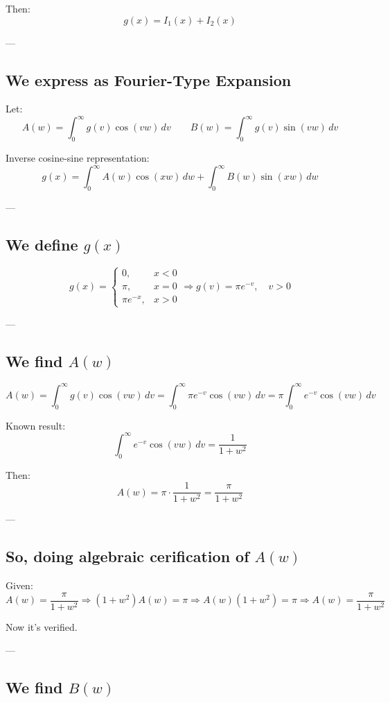 \documentclass{article}
\begin{document}
Then:
\[
g(x) = I_1(x) + I_2(x)
\]

---

\subsection*{We express as Fourier-Type Expansion}

Let:
\[
A(w) = \int_0^\infty g(v) \cos(vw) \, dv
\qquad
B(w) = \int_0^\infty g(v) \sin(vw) \, dv
\]

Inverse cosine-sine representation:
\[
g(x) = \int_0^\infty A(w) \cos(xw) \, dw + \int_0^\infty B(w) \sin(xw) \, dw
\]

---

\subsection*{We define \( g(x) \)}

\[
g(x) =
\begin{cases}
0, & x < 0 \\
\pi, & x = 0 \\
\pi e^{-x}, & x > 0
\end{cases}
\Rightarrow g(v) = \pi e^{-v}, \quad v > 0
\]

---

\subsection*{We find \( A(w) \)}

\[
A(w) = \int_0^\infty g(v) \cos(vw) \, dv
= \int_0^\infty \pi e^{-v} \cos(vw) \, dv
= \pi \int_0^\infty e^{-v} \cos(vw) \, dv
\]

Known result:
\[
\int_0^\infty e^{-v} \cos(vw) \, dv = \frac{1}{1 + w^2}
\]

Then:
\[
A(w) = \pi \cdot \frac{1}{1 + w^2}
= \frac{\pi}{1 + w^2}
\]

---

\subsection*{So, doing algebraic cerification of \( A(w) \)}

Given:
\[
A(w) = \frac{\pi}{1 + w^2}
\Rightarrow (1 + w^2)A(w) = \pi
\Rightarrow A(w)(1 + w^2) = \pi
\Rightarrow A(w) = \frac{\pi}{1 + w^2}
\]

Now it's verified.

---

\subsection*{We find \( B(w) \)}
\end{document}
